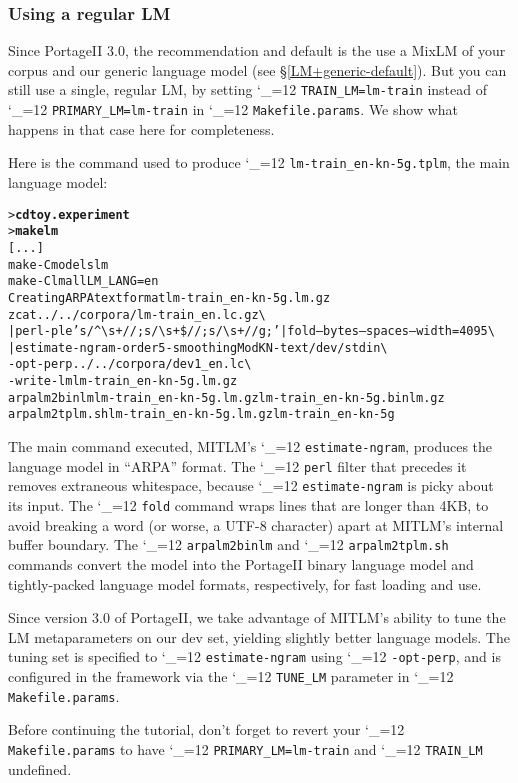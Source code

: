 \documentclass[11pt,letterpaper]{article}
\newcommand{\bs}{\textbackslash{}}
\newcommand{\PS}{PortageII\xspace}
\def\code{\begingroup\catcode`\_=12 \codex}
\newcommand{\codex}[1]{\texttt{#1}\endgroup}
\begin{document}
\subsubsection{Using a regular LM} \label{regularLM}

Since \PS 3.0, the recommendation and default is the use a MixLM of your
corpus and our generic language model (see \S\ref{LM+generic-default}).
But you can still use a single, regular LM, by setting
\code{TRAIN_LM=lm-train} instead of \code{PRIMARY_LM=lm-train} in
\code{Makefile.params}. We show what happens in that case here for
completeness.

Here is the command used to produce
\code{lm-train_en-kn-5g.tplm},
the main language model:
\begin{small}
\begin{alltt}
   > \textbf{cd toy.experiment}
   > \textbf{make lm}
   [...]
   make -C models lm
   make -C lm all LM_LANG=en
   Creating ARPA text format lm-train_en-kn-5g.lm.gz
   zcat ../../corpora/lm-train_en.lc.gz \bs
      | perl -ple 's/^{\bs}s+//; s/{\bs}s+\$//; s/{\bs}s+/ /g;' | fold --bytes --spaces --width=4095 \bs
      | estimate-ngram -order 5 -smoothing ModKN -text /dev/stdin \bs
        -opt-perp ../../corpora/dev1_en.lc \bs
        -write-lm lm-train_en-kn-5g.lm.gz
   arpalm2binlm lm-train_en-kn-5g.lm.gz lm-train_en-kn-5g.binlm.gz
   arpalm2tplm.sh lm-train_en-kn-5g.lm.gz lm-train_en-kn-5g
\end{alltt}
\end{small}
The main command executed, MITLM's \code{estimate-ngram}, produces the language
model in ``ARPA'' format.  The \code{perl} filter that precedes it
removes extraneous whitespace, because \code{estimate-ngram} is picky about its
input.  The \code{fold} command wraps lines that are longer than 4KB, to avoid
breaking a word (or worse, a UTF-8 character) apart at MITLM's internal buffer
boundary.  The \code{arpalm2binlm} and \code{arpalm2tplm.sh} commands
convert the model into the \PS binary language model and
tightly-packed language model formats, respectively, for fast loading and use.

Since version 3.0 of \PS, we take advantage of MITLM's ability to tune the LM
metaparameters on our dev set, yielding slightly better language models.  The
tuning set is specified to \code{estimate-ngram} using \code{-opt-perp}, and is
configured in the framework via the \code{TUNE_LM} parameter in
\code{Makefile.params}.

Before continuing the tutorial, don't forget to revert your
\code{Makefile.params} to have \code{PRIMARY_LM=lm-train} and \code{TRAIN_LM}
undefined.
\end{document}
